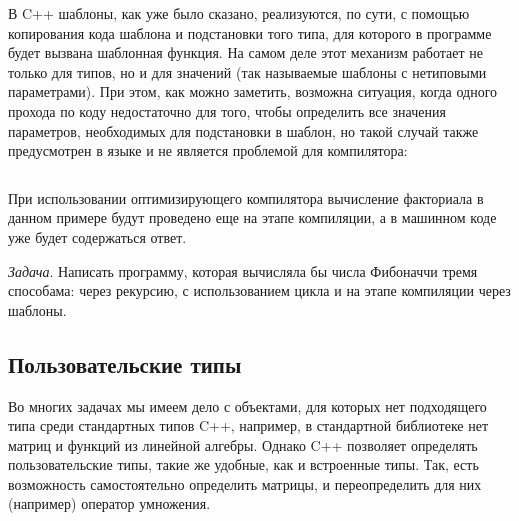 \documentclass{book}
\begin{document}
В C++ шаблоны, как уже было сказано, реализуются, по сути, с помощью копирования кода шаблона и
подстановки того типа, для которого в программе будет вызвана шаблонная функция. На самом деле этот
механизм работает не только для типов, но и для значений (так называемые шаблоны с нетиповыми
параметрами).  При этом, как можно заметить, возможна ситуация, когда одного прохода по коду
недостаточно для того, чтобы определить все значения параметров, необходимых для подстановки в
шаблон, но такой случай также предусмотрен в языке и не является проблемой для компилятора:
\inputminted{cpp}{fac-template.cpp}
При использовании оптимизирующего компилятора вычисление факториала в данном примере будут
проведено еще на этапе компиляции, а в машинном коде уже будет содержаться ответ.

{\it Задача}. Написать программу, которая вычисляла бы числа Фибоначчи тремя способама: через
рекурсию, с использованием цикла и на этапе компиляции через шаблоны.


\subsection{Пользовательские типы}

Во многих задачах мы имеем дело с объектами, для которых нет подходящего типа среди стандартных
типов C++, например, в стандартной библиотеке нет матриц и функций из линейной алгебры. Однако C++
позволяет определять пользовательские типы, такие же удобные, как и встроенные типы. Так, есть
возможность самостоятельно определить матрицы, и переопределить для них (например) оператор
умножения.
\end{document}
